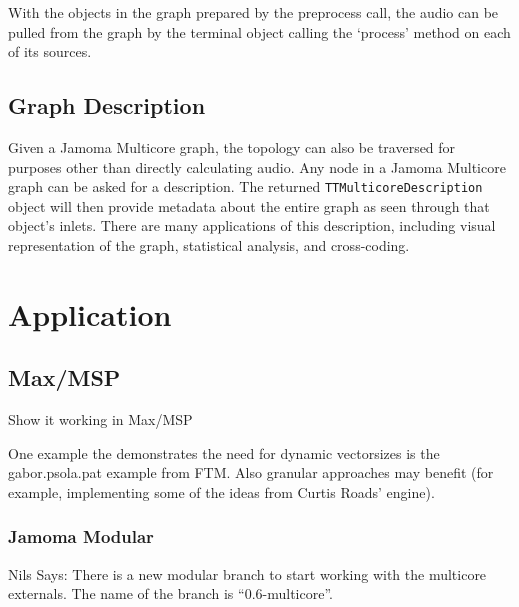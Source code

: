 \documentclass[twoside,a4paper]{article}
\begin{document}
With the objects in the graph prepared by the preprocess call, the audio can be pulled from the graph by the terminal object calling the `process' method on each of its sources.




\subsection{Graph Description} %

Given a Jamoma Multicore graph, the topology can also be traversed for purposes other than directly calculating audio.  
Any node in a Jamoma Multicore graph can be asked for a description.  The returned \texttt{TTMulticoreDescription} object will then provide 
metadata about the entire graph as seen through that object's inlets.  
There are many applications of this description, including visual representation of the graph, statistical analysis, and cross-coding.







\section{Application} %

\subsection{Max/MSP} %

Show it working in Max/MSP

One example the demonstrates the need for dynamic vectorsizes is the gabor.psola.pat example from FTM. Also granular approaches may benefit (for example, implementing some of the ideas from Curtis Roads' engine).


\subsubsection{Jamoma Modular} %


Nils Says:
There is a new modular branch to start working with the multicore 
externals. The name of the branch is ``0.6-multicore''.
\end{document}
